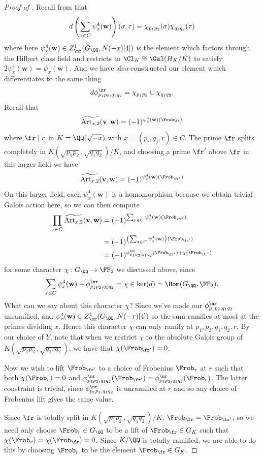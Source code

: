 \documentclass{lecturenotes}
\newcommand{\Art}{\operatorname{Art}}
\newcommand{\bv}{\mathbf{v}}
\newcommand{\bw}{\mathbf{w}}
\numberwithin{equation}{section}
\begin{document}
\begin{proof}[Proof of ]
    Recall from  that 
    \[d\braces{\sum_{x\in C}\psi_{x}^4(\bw)}(\sigma,\tau)=\chi_{p_1p_2}(\sigma)\chi_{q_1q_2}(\tau)\]
    where here $\psi_{x}^4(\bw)\in Z^1_{\nr}(G_\QQ,N(-x)[4])$ is the element which factors through the Hilbert class field and restricts to $\Cl_K\cong \Gal(H_K/K)$ to satisfy $2\psi_{x}^4(\bw)=\psi_x(\bw)$.  And we have also constructed our element which differentiates to the same thing
    \[d\phi_{p_1p_2,q_1q_2}^\nr = \chi_{p_1p_2}\cup \chi_{q_1q_2}.\]
    Recall that 
    \[\widetilde{\Art_{x,2}}(\bv,\bw)=(-1)^{\psi_x^4(\bw)(\Frob_\fr)}\]
    where $\fr\mid r$ in $K=\QQ(\sqrt{-x})$ with $x=(p_i,q_j,r)\in C$.  The prime $\fr$ splits completely in $K(\sqrt{p_1p_2},\sqrt{q_1q_2})/K$, and choosing a prime $\fr'$ above $\fr$ in this larger field we have
    \[\widetilde{\Art_{x,2}}(\bv,\bw)=(-1)^{\psi_x^4(\bw)(\Frob_{\fr'})}\]
    On this larger field, each $\psi_x^4(\bw)$ is a homomorphism because we obtain trivial Galois action here, so we can then compute
    \begin{align*}
    \prod_{x\in C}\widetilde{\Art_{x,2}}(\bv,\bw)
    &=(-1)^{\sum_{x\in C}\psi_{x}^4(\bw)(\Frob_{\fr'})}
    \\&=(-1)^{\braces{\sum_{x\in C}\psi_{x}^4(\bw)}(\Frob_{\fr'})}
    \\&=(-1)^{\phi_{p_1p_2,q_1q_2}^\nr(\Frob_{\fr'})+\chi(\Frob_{\fr'})}
    \end{align*}
    for some character $\chi:G_\QQ\to \FF_2$ we discussed above, since 
    \[\sum_{x\in C}\psi_x^4(\bw)-\phi_{p_1p_2,q_1q_2}^\nr=\chi\in \ker(d)=\Hom(G_\QQ,\FF_2).\]
    What can we say about this character $\chi$?  Since we've made our $\phi_{p_1p_2,q_1q_2}^\nr$ unramified, and $\psi_x^4(\bw)\in Z^1_\nr(G_\QQ, N(-x)[4])$ so the sum ramifies at most at the primes dividing $x$.  Hence this character $\chi$ can only ramify at $p_1,p_2,q_1,q_2,r$.  By our choice of $Y$, note that when we restrict $\chi$ to the absolute Galois group of $K(\sqrt{p_1p_2},\sqrt{q_1,q_2})$, we have that $\chi(\Frob_{\fr'})=0$.  

    Now we wish to lift $\Frob_{\fr'}$ to a choice of Frobenius $\Frob_r$ at $r$ such that both $\chi(\Frob_r)=0$ and $\phi_{p_1p_2,q_1q_2}^\nr(\Frob_{\fr'})=\phi_{p_1p_2,q_1q_2}^\nr(\Frob_{r})$.  The latter constraint is trivial, since $\phi_{p_1p_2,q_1q_2}^\nr$ is unramified at $r$ and so any choice of Frobenius lift gives the same value.

    Since $\fr$ is totally split in $K(\sqrt{p_1p_2},\sqrt{q_1q_2})/K$, $\Frob_{\fr}=\Frob_{\fr'}$, so we need only choose $\Frob_r\in G_\QQ$ to be a lift of $\Frob_{\fr}\in G_K$ such that $\chi(\Frob_r)=\chi(\Frob_{\fr})=0$.  Since $K/\QQ$ is totally ramified, we are able to do this by choosing $\Frob_r$ to be the element $\Frob_{\fr}\in G_K$.
\end{proof}
\lecture{}{}
\end{document}
